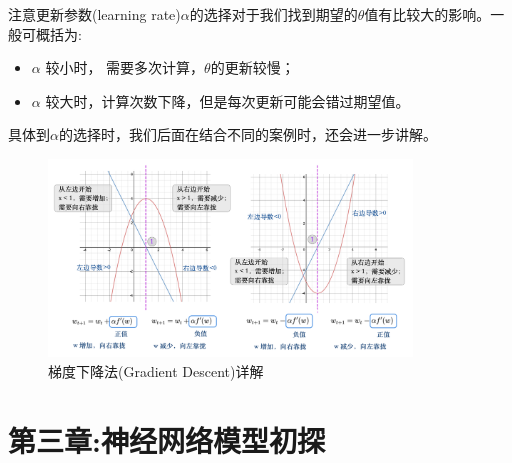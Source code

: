 \documentclass[12pt]{article}
\numberwithin{figure}{section}
\newenvironment{fullmodel}{
			\smallskip\noindent
			\begin{minipage}{\textwidth+\marginparwidth+\marginparsep}\smallskip\smallskip}
			{\smallskip\smallskip\end{minipage}\vspace{.1in}
			}
\numberwithin{equation}{section}
\begin{document}
\begin{remark}
注意更新参数(learning rate)$\alpha$的选择对于我们找到期望的$\theta$值有比较大的影响。一般可概括为:
\begin{itemize}
	\item $\alpha$ 较小时， 需要多次计算，$\theta$的更新较慢；
	\item $\alpha$ 较大时，计算次数下降，但是每次更新可能会错过期望值。
\end{itemize}
具体到$\alpha$的选择时，我们后面在结合不同的案例时，还会进一步讲解。
\end{remark}
\begin{fullmodel}
	\begin{figure}[H]
		\centering
		\includegraphics[width=0.86\textwidth]{fig/C2C2GradientDes}
		\caption{梯度下降法(Gradient Descent)详解}
	\end{figure}
\end{fullmodel}









































\newpage
\part*{第三章:神经网络模型初探}
\end{document}
